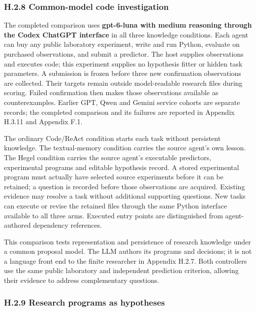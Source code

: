 \documentclass[11pt,a4paper]{article}
\begin{document}
\subsubsection*{H.2.8 Common-model code investigation}

The completed comparison uses \textbf{gpt-6-luna with medium reasoning through the
Codex ChatGPT interface} in all three knowledge conditions. Each agent can buy
any public laboratory experiment, write and run Python, evaluate on purchased
observations, and submit a predictor. The host supplies observations and executes
code; this experiment supplies no hypothesis fitter or hidden task parameters.
A submission is frozen before three new confirmation observations are collected.
Their targets remain outside model-readable research files during scoring.
Failed confirmation then makes those observations available as counterexamples.
Earlier GPT, Qwen and Gemini service cohorts are separate records; the completed
comparison and its failures are reported in Appendix H.3.11 and Appendix F.1.


The ordinary Code/ReAct condition starts each task without persistent knowledge.
The textual-memory condition carries the source agent's own lesson. The Hegel
condition carries the source agent's executable predictors, experimental
programs and editable hypothesis record. A stored experimental program must
actually have selected source experiments before it can be retained; a question
is recorded before those observations are acquired. Existing evidence may resolve
a task without additional supporting questions. New tasks can execute or revise
the retained files through the same Python interface available to all three arms.
Executed entry points are distinguished from agent-authored dependency references.


This comparison tests representation and persistence of research knowledge under
a common proposal model. The LLM authors its programs and decisions; it is not
a language front end to the finite researcher in Appendix H.2.7. Both controllers
use the same public laboratory and independent prediction criterion, allowing
their evidence to address complementary questions.


\subsubsection*{H.2.9 Research programs as hypotheses}
\end{document}
